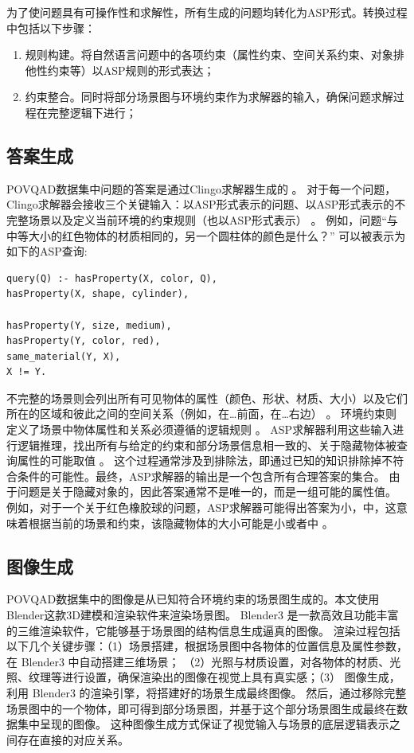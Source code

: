为了使问题具有可操作性和求解性，所有生成的问题均转化为ASP形式。转换过程中包括以下步骤：
\begin{enumerate}
\item 规则构建。将自然语言问题中的各项约束（属性约束、空间关系约束、对象排他性约束等）以ASP规则的形式表达；
\item 约束整合。同时将部分场景图与环境约束作为求解器的输入，确保问题求解过程在完整逻辑下进行；
\end{enumerate}
\subsection{答案生成}
POVQAD数据集中问题的答案是通过Clingo求解器生成的 。
对于每一个问题，Clingo求解器会接收三个关键输入：以ASP形式表示的问题、以ASP形式表示的不完整场景以及定义当前环境的约束规则（也以ASP形式表示） 。
例如，问题“与中等大小的红色物体的材质相同的，另一个圆柱体的颜色是什么？” 
可以被表示为如下的ASP查询:
\begin{lstlisting}
query(Q) :- hasProperty(X, color, Q),
hasProperty(X, shape, cylinder),

hasProperty(Y, size, medium),
hasProperty(Y, color, red),
same_material(Y, X),
X != Y.
\end{lstlisting}
不完整的场景则会列出所有可见物体的属性（颜色、形状、材质、大小）以及它们所在的区域和彼此之间的空间关系（例如，在…前面，在…右边） 。
环境约束则定义了场景中物体属性和关系必须遵循的逻辑规则 。
ASP求解器利用这些输入进行逻辑推理，找出所有与给定的约束和部分场景信息相一致的、关于隐藏物体被查询属性的可能取值 。
这个过程通常涉及到排除法，即通过已知的知识排除掉不符合条件的可能性。最终，ASP求解器的输出是一个包含所有合理答案的集合。
由于问题是关于隐藏对象的，因此答案通常不是唯一的，而是一组可能的属性值。
例如，对于一个关于红色橡胶球的问题，ASP求解器可能得出答案为{小，中}，这意味着根据当前的场景和约束，该隐藏物体的大小可能是小或者中 。
\subsection{图像生成}
POVQAD数据集中的图像是从已知符合环境约束的场景图生成的。本文使用Blender这款3D建模和渲染软件来渲染场景图。
Blender3 是一款高效且功能丰富的三维渲染软件，它能够基于场景图的结构信息生成逼真的图像。
渲染过程包括以下几个关键步骤：（1）场景搭建，根据场景图中各物体的位置信息及属性参数，在 Blender3 中自动搭建三维场景；
（2）光照与材质设置，对各物体的材质、光照、纹理等进行设置，确保渲染出的图像在视觉上具有真实感；（3）
图像生成，利用 Blender3 的渲染引擎，将搭建好的场景生成最终图像。
然后，通过移除完整场景图中的一个物体，即可得到部分场景图，并基于这个部分场景图生成最终在数据集中呈现的图像。
这种图像生成方式保证了视觉输入与场景的底层逻辑表示之间存在直接的对应关系。
